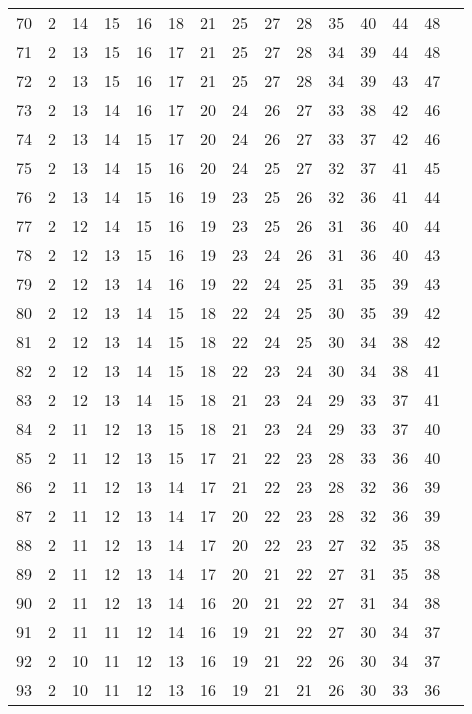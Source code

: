 \begin{scriptsize}
\begin{longtable}{c |c |c |c |c |c |c |c |c |c |c |c |c |c |c}
		70 & 2 & 14 & 15 & 16 & 18 & 21 & 25 & 27 & 28 & 35 & 40 & 44 & 48\\
		71 & 2 & 13 & 15 & 16 & 17 & 21 & 25 & 27 & 28 & 34 & 39 & 44 & 48\\
		72 & 2 & 13 & 15 & 16 & 17 & 21 & 25 & 27 & 28 & 34 & 39 & 43 & 47\\
		73 & 2 & 13 & 14 & 16 & 17 & 20 & 24 & 26 & 27 & 33 & 38 & 42 & 46\\
		74 & 2 & 13 & 14 & 15 & 17 & 20 & 24 & 26 & 27 & 33 & 37 & 42 & 46\\
		75 & 2 & 13 & 14 & 15 & 16 & 20 & 24 & 25 & 27 & 32 & 37 & 41 & 45\\
		76 & 2 & 13 & 14 & 15 & 16 & 19 & 23 & 25 & 26 & 32 & 36 & 41 & 44\\
		77 & 2 & 12 & 14 & 15 & 16 & 19 & 23 & 25 & 26 & 31 & 36 & 40 & 44\\
		78 & 2 & 12 & 13 & 15 & 16 & 19 & 23 & 24 & 26 & 31 & 36 & 40 & 43\\
		79 & 2 & 12 & 13 & 14 & 16 & 19 & 22 & 24 & 25 & 31 & 35 & 39 & 43\\
		80 & 2 & 12 & 13 & 14 & 15 & 18 & 22 & 24 & 25 & 30 & 35 & 39 & 42\\
		81 & 2 & 12 & 13 & 14 & 15 & 18 & 22 & 24 & 25 & 30 & 34 & 38 & 42\\
		82 & 2 & 12 & 13 & 14 & 15 & 18 & 22 & 23 & 24 & 30 & 34 & 38 & 41\\
		83 & 2 & 12 & 13 & 14 & 15 & 18 & 21 & 23 & 24 & 29 & 33 & 37 & 41\\
		84 & 2 & 11 & 12 & 13 & 15 & 18 & 21 & 23 & 24 & 29 & 33 & 37 & 40\\
		85 & 2 & 11 & 12 & 13 & 15 & 17 & 21 & 22 & 23 & 28 & 33 & 36 & 40\\
		86 & 2 & 11 & 12 & 13 & 14 & 17 & 21 & 22 & 23 & 28 & 32 & 36 & 39\\
		87 & 2 & 11 & 12 & 13 & 14 & 17 & 20 & 22 & 23 & 28 & 32 & 36 & 39\\
		88 & 2 & 11 & 12 & 13 & 14 & 17 & 20 & 22 & 23 & 27 & 32 & 35 & 38\\
		89 & 2 & 11 & 12 & 13 & 14 & 17 & 20 & 21 & 22 & 27 & 31 & 35 & 38\\
		90 & 2 & 11 & 12 & 13 & 14 & 16 & 20 & 21 & 22 & 27 & 31 & 34 & 38\\
		91 & 2 & 11 & 11 & 12 & 14 & 16 & 19 & 21 & 22 & 27 & 30 & 34 & 37\\
		92 & 2 & 10 & 11 & 12 & 13 & 16 & 19 & 21 & 22 & 26 & 30 & 34 & 37\\
		93 & 2 & 10 & 11 & 12 & 13 & 16 & 19 & 21 & 21 & 26 & 30 & 33 & 36\\

\end{longtable}
\end{scriptsize}
